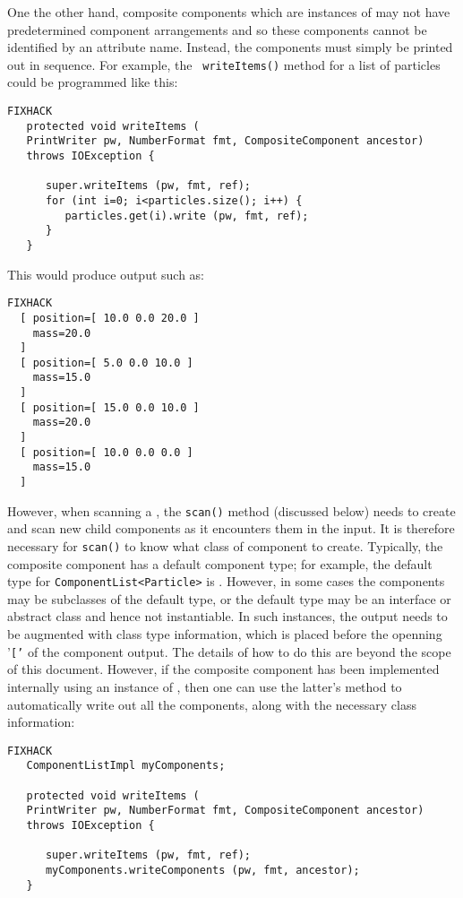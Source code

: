 \documentclass{article}
\begin{document}
One the other hand, composite components which are instances of
 may
not have predetermined component arrangements and so these components
cannot be identified by an attribute name. Instead, the components
must simply be printed out in sequence.  For example, the {\tt
writeItems()} method for a list of particles could be programmed like
this:
\begin{lstlisting}FIXHACK
   protected void writeItems (
   PrintWriter pw, NumberFormat fmt, CompositeComponent ancestor) 
   throws IOException {

      super.writeItems (pw, fmt, ref);
      for (int i=0; i<particles.size(); i++) {
         particles.get(i).write (pw, fmt, ref);
      }
   }   
\end{lstlisting}
This would produce output such as:
\begin{lstlisting}FIXHACK
  [ position=[ 10.0 0.0 20.0 ]
    mass=20.0
  ]
  [ position=[ 5.0 0.0 10.0 ]
    mass=15.0
  ]
  [ position=[ 15.0 0.0 10.0 ]
    mass=20.0
  ]
  [ position=[ 10.0 0.0 0.0 ]
    mass=15.0
  ]
\end{lstlisting}
However, when scanning a
, the
{\tt scan()} method (discussed below) needs to create and scan new
child components as it encounters them in the input.  It is therefore
necessary for {\tt scan()} to know what class of component to create.
Typically, the composite component has a default component
type; for example, the default type for {\tt ComponentList<Particle>}
is . However, in some
cases the components may be subclasses of the default type, or the
default type may be an interface or abstract class and hence not
instantiable. In such instances, the output needs to be augmented with
class type information, which is placed before the openning '{\tt ['}
of the component output.  The details of how to do
this are beyond the scope of this document. However,
if the composite component has been implemented internally using
an instance of 
,
then one can use the latter's
method to automatically write out all the components, along with the necessary
class information:
\begin{lstlisting}FIXHACK
   ComponentListImpl myComponents; 

   protected void writeItems (
   PrintWriter pw, NumberFormat fmt, CompositeComponent ancestor) 
   throws IOException {

      super.writeItems (pw, fmt, ref);
      myComponents.writeComponents (pw, fmt, ancestor);
   }
\end{lstlisting}
\end{document}
